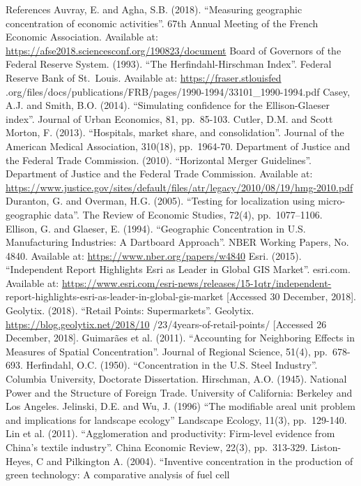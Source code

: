 \documentclass[]{article}
\begin{document}
References Auvray, E. and Agha, S.B. (2018). ``Measuring geographic
concentration of economic activities''. 67th Annual Meeting of the
French Economic Association. Available at:
\url{https://afse2018.sciencesconf.org/190823/document} Board of
Governors of the Federal Reserve System. (1993). ``The
Herfindahl-Hirschman Index''. Federal Reserve Bank of St.~Louis.
Available at: \url{https://fraser.stlouisfed}
.org/files/docs/publications/FRB/pages/1990-1994/33101\_1990-1994.pdf
Casey, A.J. and Smith, B.O. (2014). ``Simulating confidence for the
Ellison-Glaeser index''. Journal of Urban Economics, 81, pp.~85-103.
Cutler, D.M. and Scott Morton, F. (2013). ``Hospitals, market share, and
consolidation''. Journal of the American Medical Association, 310(18),
pp.~1964-70. Department of Justice and the Federal Trade Commission.
(2010). ``Horizontal Merger Guidelines''. Department of Justice and the
Federal Trade Commission. Available at:
\url{https://www.justice.gov/sites/default/files/atr/legacy/2010/08/19/hmg-2010.pdf}
Duranton, G. and Overman, H.G. (2005). ``Testing for localization using
micro-geographic data''. The Review of Economic Studies, 72(4),
pp.~1077--1106. Ellison, G. and Glaeser, E. (1994). ``Geographic
Concentration in U.S. Manufacturing Industries: A Dartboard Approach''.
NBER Working Papers, No. 4840. Available at:
\url{https://www.nber.org/papers/w4840} Esri. (2015). ``Independent
Report Highlights Esri as Leader in Global GIS Market''. esri.com.
Available at:
\url{https://www.esri.com/esri-news/releases/15-1qtr/independent-}
report-highlights-esri-as-leader-in-global-gis-market {[}Accessed 30
December, 2018{]}. Geolytix. (2018). ``Retail Points: Supermarkets''.
Geolytix. \url{https://blog.geolytix.net/2018/10}
/23/4years-of-retail-points/ {[}Accessed 26 December, 2018{]}. Guimarães
et al. (2011). ``Accounting for Neighboring Effects in Measures of
Spatial Concentration''. Journal of Regional Science, 51(4),
pp.~678-693. Herfindahl, O.C. (1950). ``Concentration in the U.S. Steel
Industry''. Columbia University, Doctorate Dissertation. Hirschman, A.O.
(1945). National Power and the Structure of Foreign Trade. University of
California: Berkeley and Los Angeles. Jelinski, D.E. and Wu, J. (1996)
``The modifiable areal unit problem and implications for landscape
ecology'' Landscape Ecology, 11(3), pp.~129-140. Lin et al. (2011).
``Agglomeration and productivity: Firm-level evidence from China's
textile industry''. China Economic Review, 22(3), pp.~313-329.
Liston-Heyes, C and Pilkington A. (2004). ``Inventive concentration in
the production of green technology: A comparative analysis of fuel cell
\end{document}
